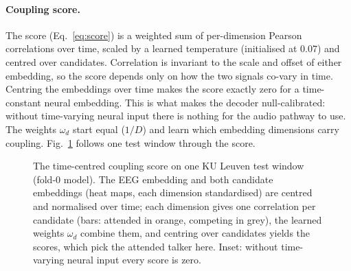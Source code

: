 \documentclass[twoside]{article}
\begin{document}
\paragraph{Coupling score.} The score (Eq.~\ref{eq:score}) is a weighted sum of
per-dimension Pearson correlations over time, scaled by a learned temperature (initialised
at 0.07) and centred over candidates. Correlation is invariant to the scale and offset of
either embedding, so the score depends only on how the two signals co-vary in time.
Centring the embeddings over time makes the score exactly zero for a time-constant neural
embedding. This is what makes the decoder null-calibrated: without time-varying neural
input there is nothing for the audio pathway to use. The weights $\omega_d$ start equal
($1/D$) and learn which embedding dimensions carry coupling. Fig.~\ref{fig:net_coupling}
follows one test window through the score.

\begin{figure}[t]\centering
\resizebox{\textwidth}{!}{}
\caption{The time-centred coupling score on one KU Leuven test window (fold-0 model). The
EEG embedding and both candidate embeddings (heat maps, each dimension standardised) are
centred and normalised over time; each dimension gives one correlation per candidate
(bars: attended in orange, competing in grey), the learned weights $\omega_d$ combine them, and
centring over candidates yields the scores, which pick the attended talker here. Inset:
without time-varying neural input every score is zero.}\label{fig:net_coupling}
\end{figure}
\end{document}
